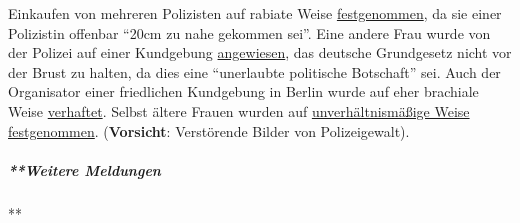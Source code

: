 \begin{itemize}
  Einkaufen von mehreren Polizisten auf rabiate Weise
  \href{https://web.archive.org/web/20200509235301/https://www.youtube.com/watch?v=TZrKv4-jkK8}{festgenommen},
  da sie einer Polizistin offenbar ``20cm zu nahe gekommen sei''. Eine
  andere Frau wurde von der Polizei auf einer Kundgebung
  \href{https://twitter.com/ChristianFritze/status/1256609660318224385}{angewiesen},
  das deutsche Grundgesetz nicht vor der Brust zu halten, da dies eine
  ``unerlaubte politische Botschaft'' sei. Auch der Organisator einer
  friedlichen Kundgebung in Berlin wurde auf eher brachiale Weise
  \href{https://web.archive.org/web/20200506155035/https://www.youtube.com/watch?v=NbV2OH3uYxI}{verhaftet}.
  Selbst ältere Frauen wurden auf
  \href{https://www.youtube.com/watch?v=Bn11jXTjh_Y}{unverhältnismäßige
  Weise festgenommen}. (\textbf{Vorsicht}: Verstörende Bilder von
  Polizeigewalt).
\end{itemize}

\hypertarget{weitere-meldungen}{%
\subparagraph{**Weitere Meldungen}\label{weitere-meldungen}}

**


